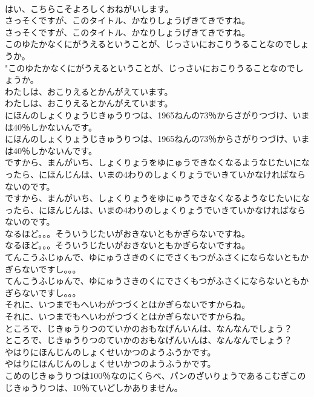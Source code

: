 \documentclass[8pt]{extreport}
\begin{document}
\begin{CJK}{UTF8}{min}
\\	はい、こちらこそよろしくおねがいします。 
\\	さっそくですが、このタイトル、かなりしょうげきてきですね。	
\\	さっそくですが、このタイトル、かなりしょうげきてきですね。 
\\	このゆたかなくにがうえるということが、じっさいにおこりうることなのでしょうか。	
\\	"このゆたかなくにがうえるということが、じっさいにおこりうることなのでしょうか。 
\\	わたしは、おこりえるとかんがえています。	
\\	わたしは、おこりえるとかんがえています。 
\\	にほんのしょくりょうじきゅうりつは、1965ねんの73％からさがりつづけ、いまは40％しかないんです。	
\\	にほんのしょくりょうじきゅうりつは、1965ねんの73％からさがりつづけ、いまは40％しかないんです。 
\\	ですから、まんがいち、しょくりょうをゆにゅうできなくなるようなじたいになったら、にほんじんは、いまの4わりのしょくりょうでいきていかなければならないのです。	
\\	ですから、まんがいち、しょくりょうをゆにゅうできなくなるようなじたいになったら、にほんじんは、いまの4わりのしょくりょうでいきていかなければならないのです。 
\\	なるほど。。。そういうじたいがおきないともかぎらないですね。	
\\	なるほど。。。そういうじたいがおきないともかぎらないですね。 
\\	てんこうふじゅんで、ゆにゅうさきのくにでさくもつがふさくにならないともかぎらないですし。。。	
\\	てんこうふじゅんで、ゆにゅうさきのくにでさくもつがふさくにならないともかぎらないですし。。。 
\\	それに、いつまでもへいわがつづくとはかぎらないですからね。	
\\	それに、いつまでもへいわがつづくとはかぎらないですからね。 
\\	ところで、じきゅうりつのていかのおもなげんいんは、なんなんでしょう？	
\\	ところで、じきゅうりつのていかのおもなげんいんは、なんなんでしょう？ 
\\	やはりにほんじんのしょくせいかつのようふうかです。	
\\	やはりにほんじんのしょくせいかつのようふうかです。 
\\	こめのじきゅうりつは100％なのにくらべ、パンのざいりょうであるこむぎこのじきゅうりつは、10％ていどしかありません。	

\end{CJK}
\end{document}
